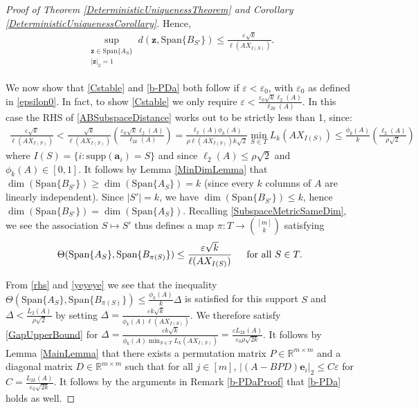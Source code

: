 \documentclass[journal, onecolumn]{IEEEtran}
\begin{document}
\begin{proof}[Proof of Theorem \ref{DeterministicUniquenessTheorem} and Corollary \ref{DeterministicUniquenessCorollary}]
Hence,
\begin{align}\label{ABSubspaceDistance}
\sup_{ \substack{ \mathbf{z} \in \text{Span}\{A_{S}\} \\ |\mathbf{z}|_2 = 1} } d(\mathbf{z}, \text{Span}\{B_{S'}\}) \leq \frac{\varepsilon\sqrt{k}}{\ell(AX_{I(S)})}.
\end{align}

We now show that \eqref{Cstable} and \eqref{b-PDa} both follow if $\varepsilon < \varepsilon_0$, with $\varepsilon_0$ as defined in \eqref{epsilon0}. In fact, to show \eqref{Cstable} we only require $\varepsilon <  \frac{\varepsilon_0 \sqrt{k} \ell_2(A)}{\ell_{2k}(A)}$. In this case the RHS of \eqref {ABSubspaceDistance} works out to be strictly less than 1, since:
\begin{align}\label{rhs}
\frac{\varepsilon\sqrt{k}}{\ell(AX_{I(S)})} 
< \frac{\sqrt{k}}{\ell(AX_{I(S)})} \left( \frac{\varepsilon_0 \sqrt{k} \ell_2(A)}{\ell_{2k}(A)} \right)
= \frac{\ell_2(A) \phi_k(A)}{\rho \ell(AX_{I(S)}) k \sqrt{2}} \min_{S \in T}L_k(AX_{I(S)})
\leq \frac{\phi_k(A)}{k} \left( \frac{\ell_2(A)}{ \rho \sqrt{2}} \right)
\end{align}
%
where $I(S) = \{i: \text{supp}(\mathbf{a}_i)=S\}$ and since $\ell_2(A) \leq \rho \sqrt{2}$ and $\phi_k(A) \in [0,1]$. It follows by Lemma \ref{MinDimLemma} that $\dim(\text{Span}\{B_{S'}\}) \geq \dim(\text{Span}\{A_{S}\}) = k$ (since every $k$ columns of $A$ are linearly independent). Since $|S'| = k$, we have $\dim(\text{Span}\{B_{S'}\}) \leq k$, hence $\dim(\text{Span}\{B_{S'}\}) = \dim(\text{Span}\{A_{S}\})$. Recalling \eqref{SubspaceMetricSameDim},  we see the association $S \mapsto S'$ thus defines a map $\pi: T \to {[m] \choose k}$ satisfying
\begin{align}\label{yeyeye}
\Theta(\text{Span}\{A_{S}\}, \text{Span}\{B_{\pi(S)}\}) \leq \frac{\varepsilon\sqrt{k}}{\ell(AX_{I(S)})} \indent \text{for all } S \in T.
\end{align}

From \eqref{rhs} and \eqref{yeyeye} we see that the inequality $\Theta(\text{Span}\{A_{S}\}, \text{Span}\{B_{\pi(S)}\}) \leq \frac{ \phi_k(A) }{k} \Delta$ is satisfied for this support $S$ and $\Delta < \frac{L_2(A)}{\rho \sqrt{2}}$ by setting $\Delta = \frac{\varepsilon k\sqrt{k}}{\phi_k(A)\ell(AX_{I(S)})}$. We therefore satisfy \eqref{GapUpperBound} for $\Delta = \frac{\varepsilon k\sqrt{k}}{\phi_k(A)\min_{S \in T} L_k(AX_{I(S)})} = \frac{\varepsilon L_{2k}(A)}{\varepsilon_0 \rho \sqrt{2k}}$. It follows by Lemma \ref{MainLemma} that there exists a permutation matrix $P \in \mathbb{R}^{m \times m}$ and a diagonal matrix $D \in \mathbb{R}^{m \times m}$ such that for all $j \in [m]$,
$|(A - BPD)\mathbf{e}_i|_2 \leq C\varepsilon$ for $C = \frac{ L_{2k}(A)}{\varepsilon_0 \sqrt{2k}}$. It follows by the arguments in Remark \ref{b-PDaProof} that \eqref{b-PDa} holds as well.
\end{proof}
\end{document}
